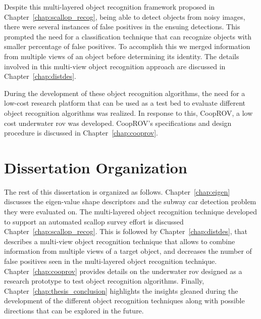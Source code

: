 \documentclass {udthesis}
\begin{document}
Despite this multi-layered object recognition framework proposed in Chapter~\ref{chap:scallop_recog}, being able to detect objects from noisy images, there were 
several instances of false positives in the ensuing detections. This prompted the need for a classification technique that can recognize objects with smaller percentage of
false positives. To accomplish this we merged information from multiple views of an object before determining its identity. The details involved in this
multi-view object recognition approach are discussed in Chapter~\ref{chap:distdes}.

During the development of these object recognition algorithms, the need for a low-cost research platform 
that can be used as a test bed to evaluate different object recognition algorithms was realized.
In response to this, CoopROV, a low cost underwater \gls{rov} was developed. CoopROV's specifications and 
design procedure is discussed in Chapter~\ref{chap:cooprov}.

\section{Dissertation Organization}

The rest of this dissertation is organized as follows. 
Chapter~\ref{chap:eigen} discusses the eigen-value shape descriptors and the subway car detection problem they were evaluated on.
The multi-layered object recognition technique developed to support an automated scallop survey effort 
is discussed Chapter~\ref{chap:scallop_recog}.
This is followed by Chapter~\ref{chap:distdes}, that describes a multi-view object recognition technique that allows to combine information from multiple views of a target object, and decreases the number of false positives seen in the multi-layered object recognition technique.
Chapter~\ref{chap:cooprov} provides details on the underwater \gls{rov} designed as a research prototype to test object recognition algorithms.
Finally, Chapter~\ref{chap:thesis_conclusion} highlights the insights gleaned during the development of the different object recognition techniques along with possible directions that can be explored in the future.

\printglossary[type=\acronymtype]                  
\end{document}
